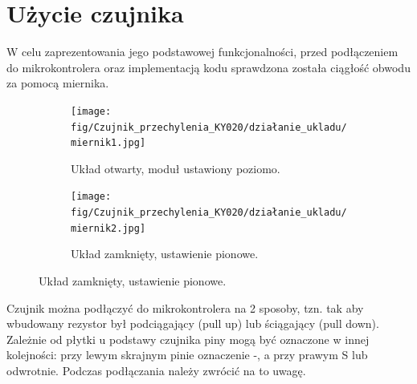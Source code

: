 \documentclass[11pt, a4paper]{article}
\begin{document}
\section{Użycie czujnika}
W celu zaprezentowania jego podstawowej funkcjonalności, przed podłączeniem do mikrokontrolera oraz implementacją kodu sprawdzona została ciągłość obwodu za pomocą miernika. 

\begin{figure}[h]
\centering
\begin{subfigure}{.4\textwidth}
  \centering
  \texttt{[image: fig/Czujnik\_przechylenia\_KY020/działanie\_ukladu/miernik1.jpg]}
  \caption{Układ otwarty, moduł ustawiony poziomo.}
  \label{fig:12pd}
\end{subfigure}
\begin{subfigure}{.4\textwidth}
  \centering
  \texttt{[image: fig/Czujnik\_przechylenia\_KY020/działanie\_ukladu/miernik2.jpg]}
  \caption{Układ zamknięty, ustawienie pionowe.}
  \label{fig:sub2}
\end{subfigure}
\label{fig:12pu}
\end{figure}


Czujnik można podłączyć do mikrokontrolera na 2 sposoby, tzn. tak aby wbudowany rezystor był podciągający (pull up) lub ściągający (pull down). Zależnie od płytki u podstawy czujnika piny mogą być oznaczone w innej kolejności: przy lewym skrajnym pinie oznaczenie -, a przy prawym S lub odwrotnie.
Podczas podłączania należy zwrócić na to uwagę. \\
\end{document}

